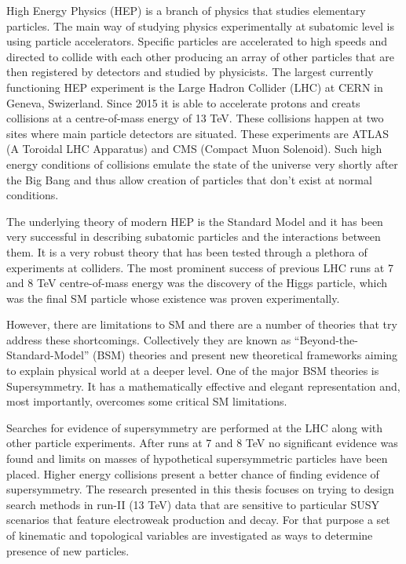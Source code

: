 High Energy Physics (HEP) is a branch of physics that studies elementary particles. The main way of studying physics experimentally at subatomic level is using particle accelerators. Specific particles are accelerated to high speeds and directed to collide with each other producing an array of other particles that are then registered by detectors and studied by physicists. The largest currently functioning HEP experiment is the Large Hadron Collider (LHC) at CERN in Geneva, Swizerland. Since 2015 it is able to accelerate protons and creats collisions at a centre-of-mass energy of 13 TeV. These collisions happen at two sites where main particle detectors are situated. These experiments are ATLAS (A Toroidal LHC Apparatus) and CMS (Compact Muon Solenoid). Such high energy conditions of collisions emulate the state of the universe very shortly after the Big Bang and thus allow creation of particles that don't exist at normal conditions. 

The underlying theory of modern HEP is the Standard Model and it has been very successful in describing subatomic particles and the interactions between them. It is a very robust theory that has been tested through a plethora of experiments at colliders. The most prominent success of previous LHC runs at 7 and 8 TeV centre-of-mass energy was the discovery of the Higgs particle, which 
was the final SM particle whose existence was proven experimentally.   

However, there are limitations to SM and there are a number of theories that try address these shortcomings. Collectively they are known as “Beyond-the-Standard-Model” (BSM) theories and present new theoretical frameworks aiming to explain physical world at a deeper level. One of the major BSM theories is Supersymmetry. It has a mathematically effective and elegant representation and, most importantly, overcomes some critical SM limitations.

Searches for evidence of supersymmetry are performed at the LHC along with other particle experiments. After runs at 7 and 8 TeV no significant evidence was found and limits on masses of hypothetical supersymmetric particles have been placed. Higher energy collisions present a better chance of finding  evidence of supersymmetry. The research presented in this thesis focuses on trying to design search methods in run-II (13 TeV) data that are sensitive to particular SUSY scenarios that feature electroweak production and decay. For that purpose a set of kinematic and topological variables are investigated as ways to determine presence of new particles.
